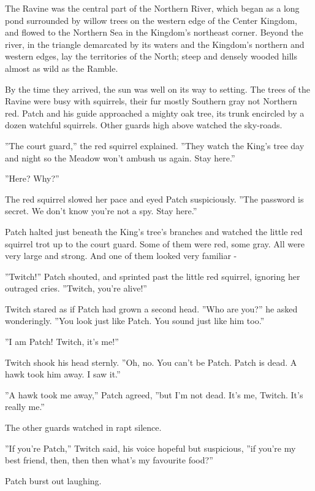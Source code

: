 \documentclass[11pt]{article}
\begin{document}
The Ravine was the central part of the Northern River, which began as a long pond surrounded by willow trees on the western edge of the Center Kingdom, and flowed to the Northern Sea in the Kingdom's northeast corner. Beyond the river, in the triangle demarcated by its waters and the Kingdom's northern and western edges, lay the territories of the North; steep and densely wooded hills almost as wild as the Ramble.\par
By the time they arrived, the sun was well on its way to setting. The trees of the Ravine were busy with squirrels, their fur mostly Southern gray not Northern red. Patch and his guide approached a mighty oak tree, its trunk encircled by a dozen watchful squirrels. Other guards high above watched the sky-roads.\par
 ''The court guard,'' the red squirrel explained. ''They watch the King's tree day and night so the Meadow won't ambush us again. Stay here.''\par
 ''Here? Why?''\par
 The red squirrel slowed her pace and eyed Patch suspiciously. ''The password is secret. We don't know you're not a spy. Stay here.''\par
 Patch halted just beneath the King's tree's branches and watched the little red squirrel trot up to the court guard. Some of them were red, some gray. All were very large and strong. And one of them looked very familiar -\par
 ''Twitch!'' Patch shouted, and sprinted past the little red squirrel, ignoring her outraged cries. ''Twitch, you're alive!''\par
 Twitch stared as if Patch had grown a second head. ''Who are you?'' he asked wonderingly. ''You look just like Patch. You sound just like him too.''\par
 ''I am Patch! Twitch, it's me!''\par
 Twitch shook his head sternly. ''Oh, no. You can't be Patch. Patch is dead. A hawk took him away. I saw it.''\par
 ''A hawk took me away,'' Patch agreed, ''but I'm not dead. It's me, Twitch. It's really me.''\par
 The other guards watched in rapt silence.\par
 ''If you're Patch,'' Twitch said, his voice hopeful but suspicious, ''if you're my best friend, then, then %
 then what's my favourite food?''\par
 Patch burst out laughing.\par
\end{document}
